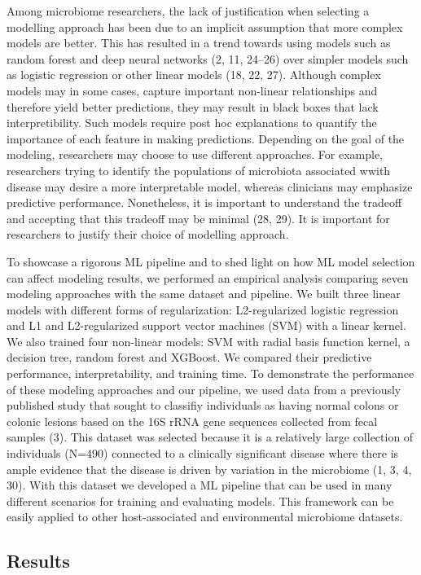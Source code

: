 \documentclass[11pt,]{article}
\begin{document}
Among microbiome researchers, the lack of justification when selecting a
modelling approach has been due to an implicit assumption that more
complex models are better. This has resulted in a trend towards using
models such as random forest and deep neural networks (2, 11, 24--26)
over simpler models such as logistic regression or other linear models
(18, 22, 27). Although complex models may in some cases, capture
important non-linear relationships and therefore yield better
predictions, they may result in black boxes that lack interpretibility.
Such models require post hoc explanations to quantify the importance of
each feature in making predictions. Depending on the goal of the
modeling, researchers may choose to use different approaches. For
example, researchers trying to identify the populations of microbiota
associated wwith disease may desire a more interpretable model, whereas
clinicians may emphasize predictive performance. Nonetheless, it is
important to understand the tradeoff and accepting that this tradeoff
may be minimal (28, 29). It is important for researchers to justify
their choice of modelling approach.

To showcase a rigorous ML pipeline and to shed light on how ML model
selection can affect modeling results, we performed an empirical
analysis comparing seven modeling approaches with the same dataset and
pipeline. We built three linear models with different forms of
regularization: L2-regularized logistic regression and L1 and
L2-regularized support vector machines (SVM) with a linear kernel. We
also trained four non-linear models: SVM with radial basis function
kernel, a decision tree, random forest and XGBoost. We compared their
predictive performance, interpretability, and training time. To
demonstrate the performance of these modeling approaches and our
pipeline, we used data from a previously published study that sought to
classifiy individuals as having normal colons or colonic lesions based
on the 16S rRNA gene sequences collected from fecal samples (3). This
dataset was selected because it is a relatively large collection of
individuals (N=490) connected to a clinically significant disease where
there is ample evidence that the disease is driven by variation in the
microbiome (1, 3, 4, 30). With this dataset we developed a ML pipeline
that can be used in many different scenarios for training and evaluating
models. This framework can be easily applied to other host-associated
and environmental microbiome datasets.

\subsection{Results}\label{results}
\end{document}

